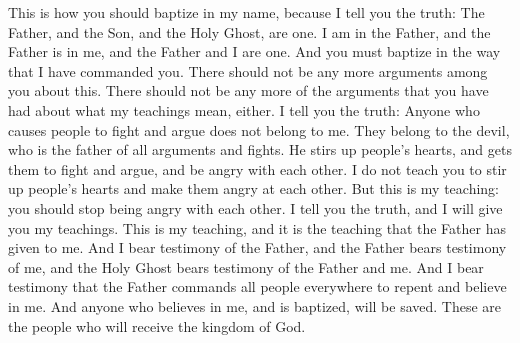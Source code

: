 This is how you should baptize in my name, because I tell you the truth: The Father, and the Son, and the Holy Ghost, are one. I am in the Father, and the Father is in me, and the Father and I are one.
\bverse \iffalse And according as I have commanded you thus shall ye baptize.  And there shall be no disputations among you, as there have hitherto been; neither shall there be disputations among you concerning the points of my doctrine, as there have hitherto been. \fi
And you must baptize in the way that I have commanded you. There should not be any more arguments among you about this. There should not be any more of the arguments that you have had about what my teachings mean, either. 
\bverse \iffalse For verily, verily I say unto you, he that hath the spirit of contention is not of me, but is of the devil, who is the father of contention, and he stirreth up the hearts of men to contend with anger, one with another. \fi
I tell you the truth: Anyone who causes people to fight and argue does not belong to me. They belong to the devil, who is the father of all arguments and fights. He stirs up people's hearts, and gets them to fight and argue, and be angry with each other.
\bverse \iffalse Behold, this is not my doctrine, to stir up the hearts of men with anger, one against another; but this is my doctrine, that such things should be done away. \fi
I do not teach you to stir up people's hearts and make them angry at each other. But this is my teaching: you should stop being angry with each other.
\bverse \iffalse Behold, verily, verily, I say unto you, I will declare unto you my doctrine. \fi
I tell you the truth, and I will give you my teachings.
\bverse \iffalse And this is my doctrine, and it is the doctrine which the Father hath given unto me; and I bear record of the Father, and the Father beareth record of me, and the Holy Ghost beareth record of the Father and me; and I bear record that the Father commandeth all men, everywhere, to repent and believe in me. \fi
This is my teaching, and it is the teaching that the Father has given to me. And I bear testimony of the Father, and the Father bears testimony of me, and the Holy Ghost bears testimony of the Father and me. And I bear testimony that the Father commands all people everywhere to repent and believe in me.
\bverse \iffalse And whoso believeth in me, and is baptized, the same shall be saved; and they are they who shall inherit the kingdom of God. \fi
And anyone who believes in me, and is baptized, will be saved. These are the people who will receive the kingdom of God.
